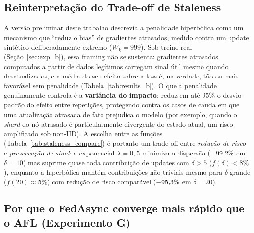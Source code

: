 \documentclass[conference,a4paper]{IEEEtran}
\begin{document}
\subsection{Reinterpretação do Trade-off de Staleness}

A versão preliminar deste trabalho descrevia a penalidade hiperbólica como
um mecanismo que ``reduz o bias'' de gradientes atrasados, medido contra um
update sintético deliberadamente extremo ($W_k=999$). Sob treino real
(Seção~\ref{sec:exp_b}), essa framing não se sustenta: gradientes atrasados
computados a partir de dados legítimos carregam sinal útil mesmo quando
desatualizados, e a média do seu efeito sobre a loss é, na verdade, tão ou
mais favorável sem penalidade (Tabela~\ref{tab:results_b}). O que a
penalidade genuinamente controla é a \textbf{variância do impacto}: reduz
em até 95\% o desvio-padrão do efeito entre repetições, protegendo contra os
casos de cauda em que uma atualização atrasada de fato prejudica o modelo
(por exemplo, quando o \textit{shard} do nó atrasado é particularmente
divergente do estado atual, um risco amplificado sob non-IID). A escolha
entre as funções (Tabela~\ref{tab:staleness_compare}) é portanto um
trade-off entre \emph{redução de risco} e \emph{preservação de sinal}: a
exponencial $\lambda=0{,}5$ minimiza a dispersão ($-99{,}2\%$
em $\delta=10$) mas suprime quase toda contribuição de updates com $\delta>5$
($f(\delta)<8\%$), enquanto a hiperbólica mantém contribuições não-triviais
mesmo para $\delta$ grande ($f(20)\approx5\%$) com redução de risco
comparável ($-95{,}3\%$ em $\delta=20$).

\subsection{Por que o FedAsync converge mais rápido que o AFL (Experimento G)}
\label{sec:discussion_fedasync}
\end{document}
